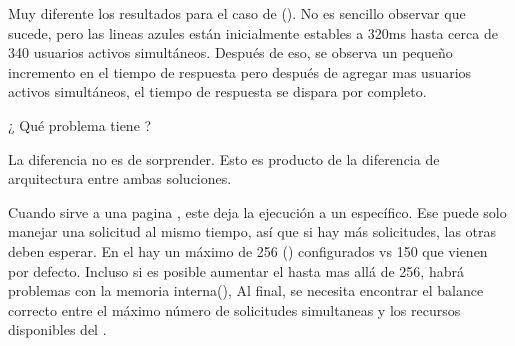 Muy diferente los resultados para el caso de \phpNAME(). No es sencillo observar que sucede, pero las lineas azules están inicialmente estables a 320ms hasta cerca de 340 usuarios activos simultáneos. Después de eso, se observa un pequeño incremento en el tiempo de respuesta pero después de agregar mas usuarios activos simultáneos, el tiempo de respuesta se dispara por completo. 

¿ Qué problema tiene \phpApacheNAME?

La diferencia no es de sorprender. Esto es producto de la diferencia de arquitectura entre ambas soluciones.

Cuando \apacheDosNAME sirve a una pagina \phpNAME, este deja la ejecución \phpNAME a un \childProcessPC específico. Ese \childProcessPC puede solo manejar una solicitud \phpNAME al mismo tiempo, así que si hay más solicitudes, las otras deben esperar. En el \serverAS hay un máximo de 256 \clientsAS (\maxClientsDB) configurados vs 150 que vienen por defecto. Incluso si es posible aumentar el \maxClientsDB hasta mas allá de 256, habrá problemas con la memoria interna(\memoryRamPC), Al final, se necesita encontrar el balance correcto entre el máximo número de solicitudes simultaneas y los recursos disponibles del \serverAS.


